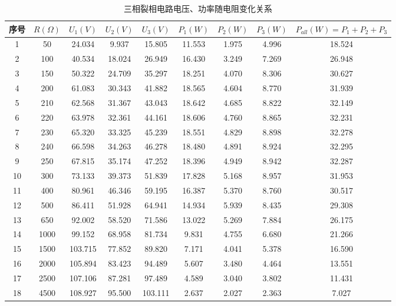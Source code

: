\documentclass[12pt]{article}%
\begin{document}
\begin{table}[htbp]
  \centering
  \caption{\heiti{}三相裂相电路电压、功率随电阻变化关系}
    \begin{tabular}{ccccccccc}
    \hline
    序号 & $R(\Omega)$  & $U_1(V)$ & $U_2(V)$ & $U_3(V)$ & $P_1(W) $&$ P_2(W) $& $P_3(W) $& $P_{all}(W)=P_1+P_ 2+P_3$\\
        \hline
    1  & 50 & 24.034  & 9.937  & 15.805  & 11.553  & 1.975  & 4.996  & 18.524  \\
    2  & 100 & 40.534  & 18.024  & 26.949  & 16.430  & 3.249  & 7.269  & 26.948  \\
    3  & 150 & 50.322  & 24.709  & 35.297  & 18.251  & 4.070  & 8.306  & 30.627  \\
    4  & 200 & 61.083  & 30.343  & 41.882  & 18.565  & 4.604  & 8.770  & 31.939  \\
    5  & 210 & 62.568  & 31.367  & 43.043  & 18.642  & 4.685  & 8.822  & 32.149  \\
    6  & 220 & 63.978  & 32.361  & 44.161  & 18.606  & 4.760  & 8.865  & 32.231  \\
    7  & 230 & 65.320  & 33.325  & 45.239  & 18.551  & 4.829  & 8.898  & 32.278  \\
    8  & 240 & 66.598  & 34.263  & 46.278  & 18.480  & 4.891  & 8.924  & 32.295  \\
    9  & 250 & 67.815  & 35.174  & 47.252  & 18.396  & 4.949  & 8.942  & 32.287  \\
    10 & 300 & 73.133  & 39.373  & 51.839  & 17.828  & 5.168  & 8.957  & 31.953  \\
    11 & 400 & 80.961  & 46.346  & 59.195  & 16.387  & 5.370  & 8.760  & 30.517  \\
    12 & 500 & 86.411  & 51.928  & 64.941  & 14.934  & 5.939  & 8.435  & 29.308  \\
    13 & 650 & 92.002  & 58.520  & 71.586  & 13.022  & 5.269  & 7.884  & 26.175  \\
    14 & 1000 & 99.152  & 68.958  & 81.734  & 9.831  & 4.755  & 6.680  & 21.266  \\
    15 & 1500 & 103.715  & 77.852  & 89.820  & 7.171  & 4.041  & 5.378  & 16.590  \\
    16 & 2000 & 105.894  & 83.423  & 94.489  & 5.607  & 3.480  & 4.464  & 13.551  \\
    17 & 2500 & 107.106  & 87.281  & 97.489  & 4.589  & 3.040  & 3.802  & 11.431  \\
    18 & 4500 & 108.927  & 95.500  & 103.111  & 2.637  & 2.027  & 2.363  & 7.027  \\

\end{tabular}
\end{table}
\end{document}
